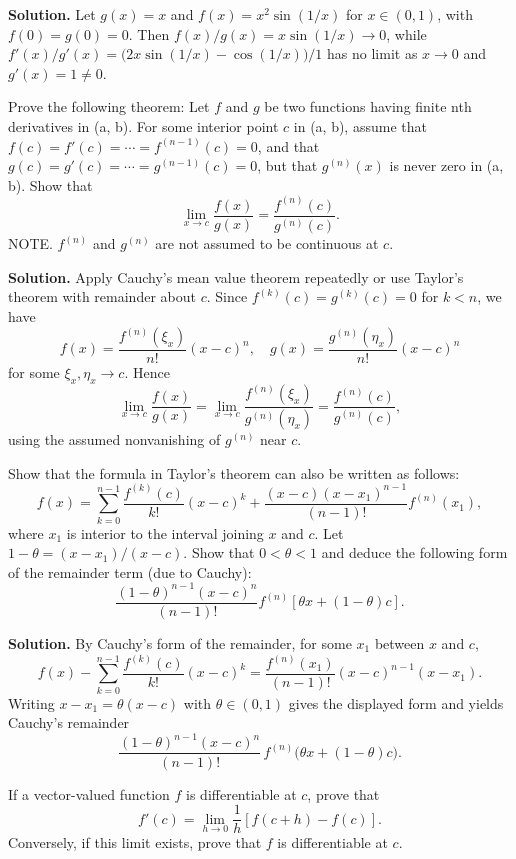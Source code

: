 \noindent\textbf{Solution.}
Let $g(x)=x$ and $f(x)=x^2\sin(1/x)$ for $x\in(0,1)$, with $f(0)=g(0)=0$. Then $f(x)/g(x)=x\sin(1/x)\to 0$, while $f'(x)/g'(x)=\big(2x\sin(1/x)-\cos(1/x)\big)/1$ has no limit as $x\to 0$ and $g'(x)=1\ne 0$.

\begin{problembox}
Prove the following theorem: Let \( f \) and \( g \) be two functions having finite nth derivatives in (a, b). For some interior point \( c \) in (a, b), assume that \( f(c) = f'(c) = \cdots = f^{(n-1)}(c) = 0 \), and that \( g(c) = g'(c) = \cdots = g^{(n-1)}(c) = 0 \), but that \( g^{(n)}(x) \) is never zero in (a, b). Show that
\[ \lim_{x \to c} \frac{f(x)}{g(x)} = \frac{f^{(n)}(c)}{g^{(n)}(c)}. \]
NOTE. \( f^{(n)} \) and \( g^{(n)} \) are not assumed to be continuous at \( c \).
\end{problembox}

\noindent\textbf{Solution.}
Apply Cauchy’s mean value theorem repeatedly or use Taylor’s theorem with remainder about $c$. Since $f^{(k)}(c)=g^{(k)}(c)=0$ for $k<n$, we have
\[f(x)=\frac{f^{(n)}(\xi_x)}{n!}(x-c)^n,\quad g(x)=\frac{g^{(n)}(\eta_x)}{n!}(x-c)^n\]
for some $\xi_x,\eta_x\to c$. Hence
\[\lim_{x\to c}\frac{f(x)}{g(x)}=\lim_{x\to c}\frac{f^{(n)}(\xi_x)}{g^{(n)}(\eta_x)}=\frac{f^{(n)}(c)}{g^{(n)}(c)},\]
using the assumed nonvanishing of $g^{(n)}$ near $c$.

\begin{problembox}
Show that the formula in Taylor's theorem can also be written as follows:
\[ f(x) = \sum_{k=0}^{n-1} \frac{f^{(k)}(c)}{k!} (x - c)^k + \frac{(x - c)(x - x_1)^{n-1}}{(n - 1)!} f^{(n)}(x_1), \]
where \( x_1 \) is interior to the interval joining \( x \) and \( c \). Let \( 1 - \theta = (x - x_1)/(x - c) \). Show that \( 0 < \theta < 1 \) and deduce the following form of the remainder term (due to Cauchy):
\[ \frac{(1 - \theta)^{n-1}(x - c)^n}{(n - 1)!} f^{(n)}[\theta x + (1 - \theta)c]. \]
\end{problembox}

\noindent\textbf{Solution.}
By Cauchy’s form of the remainder, for some $x_1$ between $x$ and $c$,
\[f(x)-\sum_{k=0}^{n-1}\frac{f^{(k)}(c)}{k!}(x-c)^k=\frac{f^{(n)}(x_1)}{(n-1)!}(x-c)^{n-1}(x-x_1).\]
Writing $x-x_1=\theta(x-c)$ with $\theta\in(0,1)$ gives the displayed form and yields Cauchy’s remainder
\[\frac{(1-\theta)^{n-1}(x-c)^n}{(n-1)!}\,f^{(n)}\big(\theta x+(1-\theta)c\big).\]

\begin{problembox}
If a vector-valued function \( f \) is differentiable at \( c \), prove that
\[ f'(c) = \lim_{h \to 0} \frac{1}{h} [f(c + h) - f(c)]. \]
Conversely, if this limit exists, prove that \( f \) is differentiable at \( c \).
\end{problembox}

